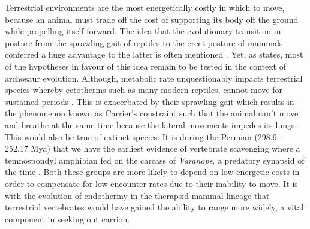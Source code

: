 \documentclass[a4paper,12pt]{article}
\begin{document}

Terrestrial environments are the most energetically costly in which to move, because an animal must trade off the cost of supporting its body off the ground while propelling itself forward. 
The idea that the evolutionary transition in posture from the sprawling gait of reptiles to the erect posture of mammals conferred a huge advantage to the latter is often mentioned \citep[e.g. benefits in terms of speed, efficiency, muscle effort and manoeuvrability; ]{sullivan2015posture}. 
Yet, as \cite{sullivan2015posture} states, most of the hypotheses in favour of this idea remain to be tested in the context of archosaur evolution. 
Although, metabolic rate unquestionably impacts terrestrial species whereby ectotherms such as many modern reptiles, cannot move for sustained periods \citep{bennett1979endothermy}. 
This is exacerbated by their sprawling gait which results in the phenomenon known as Carrier's constraint such that the animal can't move and breathe at the same time because the lateral movements impedes its lungs \citep{carrier1987evolution}. 
This would also be true of extinct species. 
It is during the Permian (298.9 - 252.17 Mya) that we have the earliest evidence of vertebrate scavenging where a temnospondyl amphibian fed on the carcass of \textit{Varanops}, a predatory synapsid of the time \citep{reisz2006articulated}. 
Both these groups are more likely to depend on low energetic costs in order to compensate for low encounter rates due to their inability to move. 
It is with the evolution of endothermy in the therapsid-mammal lineage \citep{clarke2010temperature} that terrestrial vertebrates would have gained the ability to range more widely, a vital component in seeking out carrion. 
\end{document}
